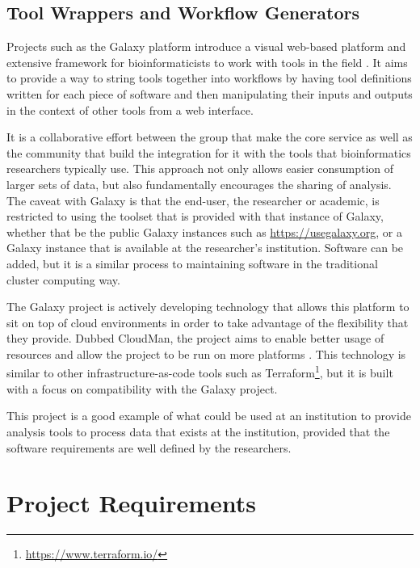 \subsection{Tool Wrappers and Workflow Generators}

Projects such as the Galaxy platform introduce a visual web-based platform and extensive framework for bioinformaticists to work with tools in the field \parencite{afgan2016galaxy}. It aims to provide a way to string tools together into workflows by having tool definitions written for each piece of software and then manipulating their inputs and outputs in the context of other tools from a web interface.

It is a collaborative effort between the group that make the core service as well as the community that build the integration for it with the tools that bioinformatics researchers typically use. This approach not only allows easier consumption of larger sets of data, but also fundamentally encourages the sharing of analysis. The caveat with Galaxy is that the end-user, the researcher or academic, is restricted to using the toolset that is provided with that instance of Galaxy, whether that be the public Galaxy instances such as \url{https://usegalaxy.org}, or a Galaxy instance that is available at the researcher's institution. Software can be added, but it is a similar process to maintaining software in the traditional cluster computing way.

The Galaxy project is actively developing technology that allows this platform to sit on top of cloud environments in order to take advantage of the flexibility that they provide. Dubbed CloudMan, the project aims to enable better usage of resources and allow the project to be run on more platforms \parencite{afgan2012cloudman}. This technology is similar to other infrastructure-as-code tools such as Terraform\footnote{\url{https://www.terraform.io/}}, but it is built with a focus on compatibility with the Galaxy project.

This project is a good example of what could be used at an institution to provide analysis tools to process data that exists at the institution, provided that the software requirements are well defined by the researchers.


\section{Project Requirements}

